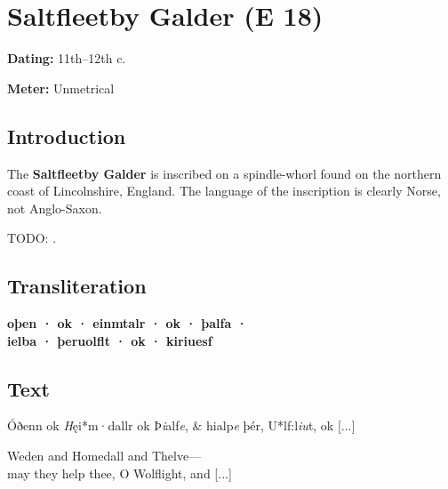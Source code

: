 \section{Saltfleetby Galder (E 18)}\chapterStart{}%

\begin{flushright}%
\textbf{Dating:} 11th--12th c.

\textbf{Meter:} Unmetrical%
\end{flushright}

\subsection{Introduction}

The \textbf{Saltfleetby Galder} is inscribed on a spindle-whorl found on the northern coast of Lincolnshire, England.  The language of the inscription is clearly Norse, not Anglo-Saxon.

TODO: \textcite[219--220]{Marold2026}.

\subsection{Transliteration}

\textbf{oþen · ok · einmtalr · ok · þalfa ·} \\
\textbf{ielba · þeruolflt · ok · kiriuesf}

\subsection{Text}

\sectionline

\bvg\bva[]%
Óðenn ok \emph{H}ęi*m·dallr ok Þ\emph{i}alf\emph{e}, &
hialp\emph{e} þér, U*lf:l\emph{iu}t, ok [...]\eva

\bvb Weden and Homedall and Thelve--- \\
may they help thee, O Wolflight, and [...]\evb\evg

\sectionline
